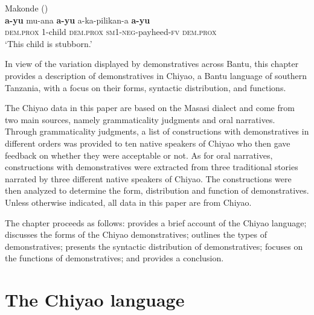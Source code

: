 \documentclass[output=paper,
            colorlinks, citecolor=brown
            ,draftmode
		  ]{langscibook}
\begin{document}
\ea Makonde (\citealt[171]{Makanjila2019})\\
    \label{ex:taji:5}
    \gll \textbf{a-yu}                  mu-ana              \textbf{a-yu}                  a-ka-pilikan-a                    \textbf{a-yu} \\
\textsc{dem.prox}    1-child              \textsc{dem.prox}   \textsc{sm1-neg}-payheed-\textsc{fv}   \textsc{dem.prox}\\ 
    \glt ‘This child is stubborn.’                                 
\z

In view of the variation displayed by demonstratives across Bantu, this chapter provides a description of demonstratives in Chiyao, a Bantu language of southern Tanzania, with a focus on their forms, syntactic distribution, and functions.

\begin{sloppypar}
The Chiyao data in this paper are based on the Masasi dialect and come from two main sources, namely grammaticality judgments and oral narratives. Through grammaticality judgments, a list of constructions with demonstratives in different orders was provided to ten native speakers of Chiyao who then gave feedback on whether they were acceptable or not. As for oral narratives, constructions with demonstratives were extracted from three traditional stories narrated by three different native speakers of Chiyao. The constructions were then analyzed to determine the form, distribution and function of demonstratives. Unless otherwise indicated, all data in this paper are from Chiyao. 
\end{sloppypar}

The chapter proceeds as follows:  provides a brief account of the Chiyao language;   discusses the forms of the Chiyao demonstratives;   outlines the types of demonstratives;  presents the syntactic distribution of demonstratives;  focuses on the functions of demonstratives; and  provides a conclusion.

\section{The Chiyao language}
\label{sec:taji:2}
\end{document}

